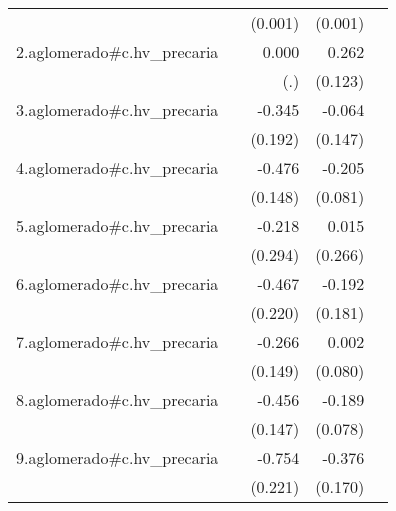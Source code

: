 {\begin{longtable}{l*{4}{D{.}{.}{-1}}}
            &                     &     (0.001)         &     (0.001)         &                     \\
\addlinespace
2.aglomerado#c.hv\_precaria&                     &       0.000         &       0.262\sym{*}  &                     \\
            &                     &         (.)         &     (0.123)         &                     \\
\addlinespace
3.aglomerado#c.hv\_precaria&                     &      -0.345         &      -0.064         &                     \\
            &                     &     (0.192)         &     (0.147)         &                     \\
\addlinespace
4.aglomerado#c.hv\_precaria&                     &      -0.476\sym{**} &      -0.205\sym{*}  &                     \\
            &                     &     (0.148)         &     (0.081)         &                     \\
\addlinespace
5.aglomerado#c.hv\_precaria&                     &      -0.218         &       0.015         &                     \\
            &                     &     (0.294)         &     (0.266)         &                     \\
\addlinespace
6.aglomerado#c.hv\_precaria&                     &      -0.467\sym{*}  &      -0.192         &                     \\
            &                     &     (0.220)         &     (0.181)         &                     \\
\addlinespace
7.aglomerado#c.hv\_precaria&                     &      -0.266         &       0.002         &                     \\
            &                     &     (0.149)         &     (0.080)         &                     \\
\addlinespace
8.aglomerado#c.hv\_precaria&                     &      -0.456\sym{**} &      -0.189\sym{*}  &                     \\
            &                     &     (0.147)         &     (0.078)         &                     \\
\addlinespace
9.aglomerado#c.hv\_precaria&                     &      -0.754\sym{***}&      -0.376\sym{*}  &                     \\
            &                     &     (0.221)         &     (0.170)         &                     \\

\end{longtable}}
